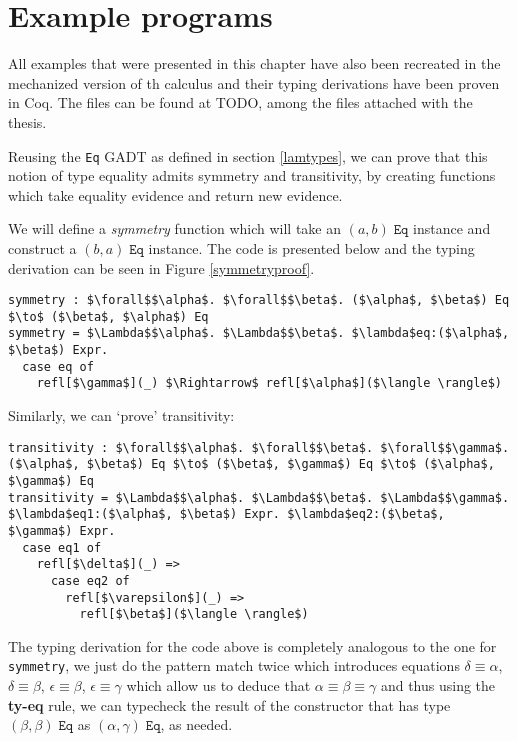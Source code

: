 \section{Example programs}
\label{lamexamples}

All  examples that were presented in this chapter have also been recreated in the mechanized version of th calculus and their typing derivations have been proven in Coq. The files can be found at TODO, among the files attached with the thesis.

Reusing the \texttt{Eq} GADT as defined in section \ref{lamtypes}, we can prove that this notion of type equality admits symmetry and transitivity, by creating functions which take equality evidence and return new evidence.

We will define a \textit{symmetry} function which will take an $(a, b) \; \texttt{Eq}$ instance and construct a $(b, a) \; \texttt{Eq}$ instance. The code is presented below and the typing derivation can be seen in Figure \ref{symmetryproof}.

\begin{lstlisting}[mathescape=true, basicstyle=\ttfamily]
symmetry : $\forall$$\alpha$. $\forall$$\beta$. ($\alpha$, $\beta$) Eq $\to$ ($\beta$, $\alpha$) Eq
symmetry = $\Lambda$$\alpha$. $\Lambda$$\beta$. $\lambda$eq:($\alpha$, $\beta$) Expr.
  case eq of
    refl[$\gamma$](_) $\Rightarrow$ refl[$\alpha$]($\langle \rangle$)
\end{lstlisting}

Similarly, we can `prove' transitivity:

\begin{lstlisting}[mathescape=true, basicstyle=\ttfamily]
transitivity : $\forall$$\alpha$. $\forall$$\beta$. $\forall$$\gamma$. ($\alpha$, $\beta$) Eq $\to$ ($\beta$, $\gamma$) Eq $\to$ ($\alpha$, $\gamma$) Eq
transitivity = $\Lambda$$\alpha$. $\Lambda$$\beta$. $\Lambda$$\gamma$. $\lambda$eq1:($\alpha$, $\beta$) Expr. $\lambda$eq2:($\beta$, $\gamma$) Expr.
  case eq1 of
    refl[$\delta$](_) =>
      case eq2 of
        refl[$\varepsilon$](_) =>    
          refl[$\beta$]($\langle \rangle$)
\end{lstlisting}

The typing derivation for the code above is completely analogous to the one for \texttt{symmetry}, we just do the pattern match twice which introduces equations $\delta \equiv \alpha$, $\delta \equiv \beta$, $\epsilon \equiv \beta$, $\epsilon \equiv \gamma$ which allow us to deduce that $\alpha \equiv \beta \equiv \gamma$ and thus using the \textbf{ty-eq} rule, we can typecheck the result of the constructor that has type $(\beta, \beta) \; \texttt{Eq}$ as $(\alpha, \gamma) \; \texttt{Eq}$, as needed.


